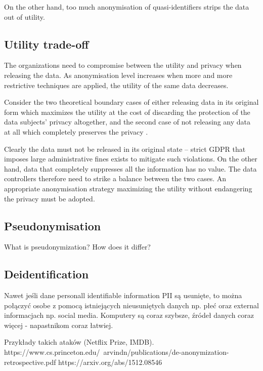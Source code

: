 \documentclass[a4paper,twoside,12pt]{book}
\begin{document}
On the other hand, too much anonymisation of quasi-identifiers strips the data out of utility.

\subsection{Utility trade-off}

The organizations need to compromise between the utility and privacy when releasing the data. As anonymisation level increases when more and more restrictive techniques are applied, the utility of the same data decreases.

Consider the two theoretical boundary cases of either releasing data in its original form which maximizes the utility at the cost of discarding the protection of the data subjects' privacy altogether, and the second case of not releasing any data at all which completely preserves the privacy \cite{bib:privacy_digital_world}.

Clearly the data must not be released in its original state – strict GDPR that imposes large administrative fines \cite{bib:art83} exists to mitigate such violations. On the other hand, data that completely suppresses all the information has no value. The data controllers therefore need to strike a balance between the two cases. An appropriate anonymisation strategy maximizing the utility without endangering the privacy must be adopted.


\subsection{Pseudonymisation}

\color{blue}
What is pseudonymization? How does it differ?
\color{black}

\subsection{Deidentification}

\color{blue}
Nawet jeśli dane personall identifiable information PII są usunięte, to można połączyć osobe z pomocą istniejących nieusuniętych danych np. płeć oraz external informacjach np. social media. Komputery są coraz szybsze, źródeł danych coraz więcej - napastnikom coraz łatwiej.

Przykłady takich ataków (Netflix Prize, IMDB).
https://www.cs.princeton.edu/~arvindn/publications/de-anonymization-retrospective.pdf
https://arxiv.org/abs/1512.08546
\end{document}
